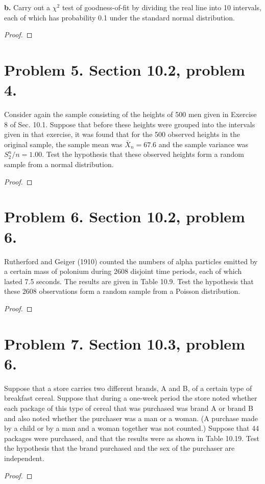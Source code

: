 \documentclass{article}
\newenvironment{hwproof}[1]
{
    #1
    \begin{proof}
}{
    \end{proof}
}
\begin{document}
\begin{hwproof}
    {
        \textbf{b.}
        Carry out a $\chi^2$ test of goodness-of-fit by dividing the real line
        into 10 intervals, each of which has probability 0.1 under the standard
        normal distribution.
    }
\end{hwproof}

\section*{Problem 5. Section 10.2, problem 4.}
\begin{hwproof}
    {
        Consider again the sample consisting of the heights of 500 men given in
        Exercise 8 of Sec. 10.1. Suppose that before these heights were grouped
        into the intervals given in that exercise, it was found that for the
        500 observed heights in the original sample, the sample mean was
        $\bar{X}_n = 67.6$ and the sample variance was $S^n_2/n = 1.00$.
        Test the hypothesis that these observed heights form a random sample from
        a normal distribution.
    }
\end{hwproof}
\section*{Problem 6. Section 10.2, problem 6.}
\begin{hwproof}
    {
        Rutherford and Geiger (1910) counted the numbers of alpha particles
        emitted by a certain mass of polonium during 2608 disjoint time periods,
        each of which lasted 7.5 seconds. The results are given in Table 10.9.
        Test the hypothesis that these 2608 observations form a random
        sample from a Poisson distribution.
    }
\end{hwproof}
\section*{Problem 7. Section 10.3, problem 6.}
\begin{hwproof}
    {
        Suppose that a store carries two different brands, A and B, of a certain
        type of breakfast cereal. Suppose that during a one-week period the
        store noted whether each package of this type of cereal that was purchased
        was brand A or brand B and also noted whether the purchaser was a man or
        a woman. (A purchase made by a child or by a man and a woman together was
        not counted.) Suppose that 44 packages were purchased, and that the results
        were as shown in Table 10.19. Test the hypothesis
        that the brand purchased and the sex of the purchaser are independent.
    }
\end{hwproof}
\end{document}
